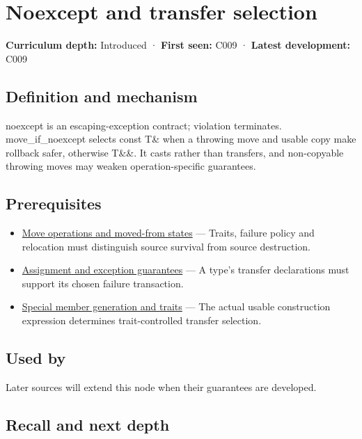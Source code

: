 \hypertarget{appendix-c746afaa47d1}{}
\section{Noexcept and transfer selection}\label{appendix-c746afaa47d1-noexcept-and-transfer-selection}

\textbf{Curriculum depth:} Introduced · \textbf{First seen:} C009 · \textbf{Latest development:} C009

\subsection{Definition and mechanism}\label{appendix-c746afaa47d1-definition-and-mechanism}

noexcept is an escaping-exception contract; violation terminates. move\_if\_noexcept selects const T\& when a throwing move and usable copy make rollback safer, otherwise T\&\&. It casts rather than transfers, and non-copyable throwing moves may weaken operation-specific guarantees.

\subsection{Prerequisites}\label{appendix-c746afaa47d1-prerequisites}

\begin{itemize}
\tightlist
\item
  \hyperref[appendix-5636651017c2]{Move operations and moved-from states} --- Traits, failure policy and relocation must distinguish source survival from source destruction.
\item
  \hyperref[appendix-bea6beb5350f]{Assignment and exception guarantees} --- A type's transfer declarations must support its chosen failure transaction.
\item
  \hyperref[appendix-42e02a12c694]{Special member generation and traits} --- The actual usable construction expression determines trait-controlled transfer selection.
\end{itemize}

\subsection{Used by}\label{appendix-c746afaa47d1-used-by}

Later sources will extend this node when their guarantees are developed.

\subsection{Recall and next depth}\label{appendix-c746afaa47d1-recall-and-next-depth}

